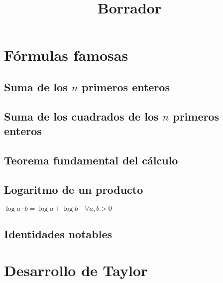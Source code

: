 \documentclass{article}
\author{}
\date{}
\title{Borrador}
\begin{document}
\maketitle


\begin{abstract}

\end{abstract}

\section{Fórmulas famosas}

\subsection{Suma de los $n$ primeros enteros}


\subsection{Suma de los cuadrados de los $n$ primeros enteros}


\subsection{Teorema fundamental del cálculo}


\subsection{Logaritmo de un producto}


$\log a·b = \log a + \log b\quad \forall a,b > 0$\label{form_log}

\subsection{Identidades notables}


\section{Desarrollo de Taylor}
\end{document}
